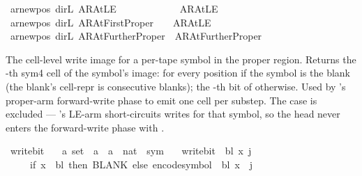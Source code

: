 \begin{isabellebody}
{\isacharbar}{\kern0pt}\ {\isachardoublequoteopen}ar{\isacharunderscore}{\kern0pt}newpos\ dir{\isachardot}{\kern0pt}L\ AR{\isacharunderscore}{\kern0pt}AtLE\ \ \ \ \ \ \ \ \ \ \ \ {\isacharequal}{\kern0pt}\ AR{\isacharunderscore}{\kern0pt}AtLE{\isachardoublequoteclose}\isanewline
{\isacharbar}{\kern0pt}\ {\isachardoublequoteopen}ar{\isacharunderscore}{\kern0pt}newpos\ dir{\isachardot}{\kern0pt}L\ AR{\isacharunderscore}{\kern0pt}AtFirstProper\ \ \ {\isacharequal}{\kern0pt}\ AR{\isacharunderscore}{\kern0pt}AtLE{\isachardoublequoteclose}\isanewline
{\isacharbar}{\kern0pt}\ {\isachardoublequoteopen}ar{\isacharunderscore}{\kern0pt}newpos\ dir{\isachardot}{\kern0pt}L\ AR{\isacharunderscore}{\kern0pt}AtFurtherProper\ {\isacharequal}{\kern0pt}\ AR{\isacharunderscore}{\kern0pt}AtFurtherProper{\isachardoublequoteclose}%
\begin{isamarkuptext}%
The cell-level write image for a per-tape symbol in
  the proper region.  Returns the -th sym4 cell
  of the symbol's image:  for every position
  if the symbol is the blank  (the blank's
  cell-repr is  consecutive blanks); the
  -th bit of 
  otherwise.  Used by 's proper-arm
  forward-write phase to emit one cell per substep.  The
   case is excluded — 's
  LE-arm short-circuits writes for that symbol, so the head
  never enters the forward-write phase with
  .%
\end{isamarkuptext}\isamarkuptrue%
\isamarkupfalse%
\ write{\isacharunderscore}{\kern0pt}bit\ {\isacharcolon}{\kern0pt}{\isacharcolon}{\kern0pt}\isanewline
\ \ {\isachardoublequoteopen}{\isacharprime}{\kern0pt}a\ set\ {\isasymRightarrow}\ {\isacharprime}{\kern0pt}a\ {\isasymRightarrow}\ {\isacharprime}{\kern0pt}a\ {\isasymRightarrow}\ nat\ {\isasymRightarrow}\ sym{}{\isachardoublequoteclose}\ \isanewline
\ \ {\isachardoublequoteopen}write{\isacharunderscore}{\kern0pt}bit\ {\isasymGamma}\ bl\ x\ j\ {\isacharequal}{\kern0pt}\isanewline
\ \ \ \ \ {\isacharparenleft}{\kern0pt}if\ x\ {\isacharequal}{\kern0pt}\ bl\ then\ BLANK{}\ else\ encode{\isacharunderscore}{\kern0pt}symbol\ {\isasymGamma}\ bl\ x\ {\isacharbang}{\kern0pt}\ j{\isacharparenright}{\kern0pt}{\isachardoublequoteclose}\isanewline
%
\isadelimtheory
\isanewline
%
\endisadelimtheory
%
\isatagtheory
{}\isamarkupfalse%
%
\endisatagtheory
{\isafoldtheory}%
%
\isadelimtheory
%
\endisadelimtheory
%
\end{isabellebody}%
